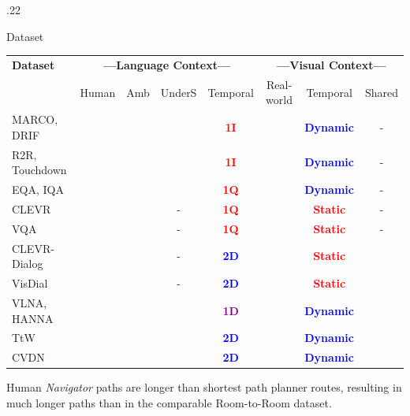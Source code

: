 \documentclass[final]{beamer}
\newcommand{\setblocksize}{\LARGE \centering}
\newcommand{\sidecolumnwidth}{.22}
\newcommand{\dataset}{CVDN}
\newcommand{\cmark}{\color{blue}{\ding{51}}}
\newcommand{\xmark}{\color{red}{\ding{55}}}
\newcommand{\good}[1]{\textcolor{blue}{\textbf{#1}}}
\newcommand{\bad}[1]{\textcolor{red}{\textbf{#1}}}
\newcommand{\neutral}[1]{\textcolor{purple}{\textbf{#1}}}
\newcommand{\nav}{\textit{Navigator}}
\begin{document}
\begin{frame}{}
\begin{columns}[t]
\begin{column}{\sidecolumnwidth\linewidth}
\begin{block}{\setblocksize Dataset}
{\begin{table}[ht!]
\centering
\begin{tiny}
\begin{tabular}{lccccccc}
    \textbf{Dataset} & \multicolumn{4}{c}{\textbf{---Language Context---}} & \multicolumn{3}{c}{\textbf{---Visual Context---}} \\
    & Human & Amb & UnderS & Temporal & Real-world & Temporal & Shared \\
    \toprule
MARCO\cite{macmahon:aaai06,chen:aaai11}, DRIF\cite{blukis:corl18} & \cmark & \xmark & \xmark & \bad{1I} & \xmark & \good{Dynamic} & - \\
    R2R\cite{anderson:cvpr18}, Touchdown\cite{chen:cvpr19} & \cmark & \xmark & \xmark & \bad{1I} & \cmark & \good{Dynamic} & - \\
    EQA\cite{das:cvpr18}, IQA\cite{gordon2018iqa} & \xmark & \xmark & \cmark & \bad{1Q} & \xmark & \good{Dynamic} & - \\
    CLEVR\cite{johnson:cvpr17} & \xmark & \xmark & - & \bad{1Q} & \xmark & \bad{Static} & - \\
    VQA\cite{antol:iccv15,hudson:cvpr18,zellers:cvpr19} & \cmark & \xmark & - & \bad{1Q} & \cmark & \bad{Static} & - \\
    CLEVR-Dialog\cite{kottur:naacl19} & \xmark & \xmark & - & \good{2D} & \xmark & \bad{Static} & \cmark \\
    VisDial\cite{das:cvpr17} & \cmark & \xmark & - & \good{2D} & \cmark & \bad{Static} & \cmark \\
    VLNA\cite{nguyen:cvpr19}, HANNA\cite{nguyen:emnlp19} & \xmark & \cmark & \cmark & \neutral{1D} & \cmark & \good{Dynamic} & \xmark \\
    TtW\cite{devries:arxiv18} & \cmark & \xmark & \cmark & \good{2D} & \cmark & \good{Dynamic} & \xmark \\
    \midrule
    \dataset{} & \cmark & \cmark & \cmark & \good{2D} & \cmark & \good{Dynamic} & \cmark \\
    \bottomrule
\end{tabular}
\end{tiny}
\end{table}

Human \nav{} paths are longer than shortest path planner routes, resulting in much longer paths than in the comparable Room-to-Room dataset.

}
\end{block}
\end{column}
\end{columns}
\end{frame}
\end{document}

